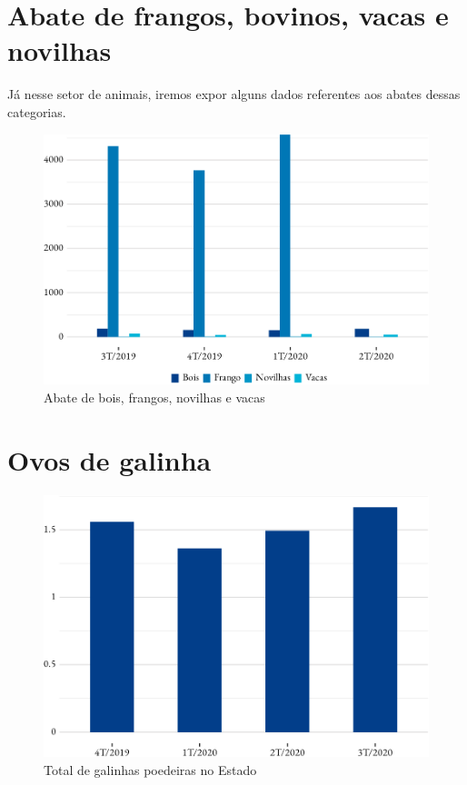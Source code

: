 \section{Abate de frangos, bovinos, vacas e novilhas}

\par Já nesse setor de animais, iremos expor alguns dados referentes aos abates dessas categorias.

\begin{figure}[h]
	\caption{Abate de bois, frangos, novilhas e vacas}
	\includegraphics{fig/abates-1.pdf}
\end{figure}
	

\section{Ovos de galinha}

\begin{figure}[h]
	\caption{Total de galinhas poedeiras no Estado}
	\includegraphics{fig/galinha_poedeiras-1.pdf}
\end{figure}

